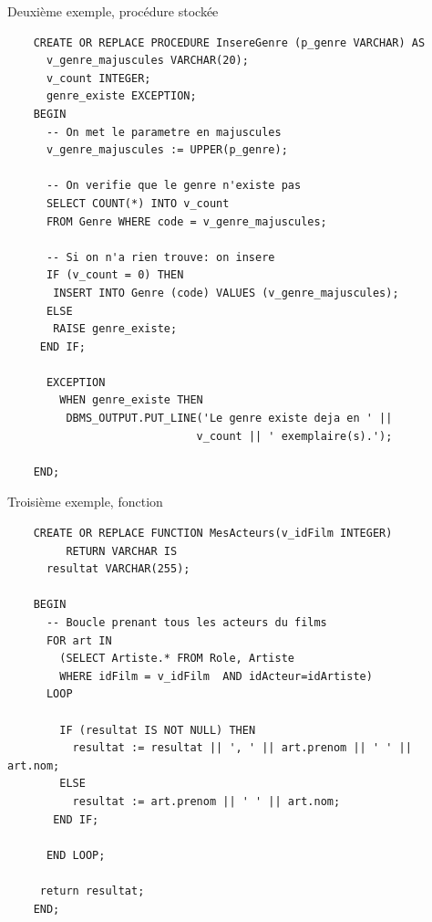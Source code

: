 \begin{frame}[fragile]{Deuxième exemple, procédure stockée}

\begin{scriptsize}
\begin{verbatim}
    CREATE OR REPLACE PROCEDURE InsereGenre (p_genre VARCHAR) AS 
      v_genre_majuscules VARCHAR(20);
      v_count INTEGER;
      genre_existe EXCEPTION;
    BEGIN
      -- On met le parametre en majuscules
      v_genre_majuscules := UPPER(p_genre);

      -- On verifie que le genre n'existe pas 
      SELECT COUNT(*) INTO v_count 
      FROM Genre WHERE code = v_genre_majuscules;
      
      -- Si on n'a rien trouve: on insere
      IF (v_count = 0) THEN
       INSERT INTO Genre (code) VALUES (v_genre_majuscules);
      ELSE
       RAISE genre_existe;
     END IF;
  
      EXCEPTION
        WHEN genre_existe THEN
         DBMS_OUTPUT.PUT_LINE('Le genre existe deja en ' ||
                             v_count || ' exemplaire(s).');

    END;
\end{verbatim}
\end{scriptsize}
\end{frame}


\begin{frame}[fragile]{Troisième exemple, fonction}

\begin{scriptsize}
\begin{verbatim}
    CREATE OR REPLACE FUNCTION MesActeurs(v_idFilm INTEGER) 
         RETURN VARCHAR IS
      resultat VARCHAR(255);

    BEGIN
      -- Boucle prenant tous les acteurs du films 
      FOR art IN 
        (SELECT Artiste.* FROM Role, Artiste  
        WHERE idFilm = v_idFilm  AND idActeur=idArtiste)
      LOOP

        IF (resultat IS NOT NULL) THEN
          resultat := resultat || ', ' || art.prenom || ' ' || art.nom;
        ELSE   
          resultat := art.prenom || ' ' || art.nom;
       END IF;

      END LOOP;

     return resultat;
    END;
\end{verbatim}
\end{scriptsize}
\end{frame}

